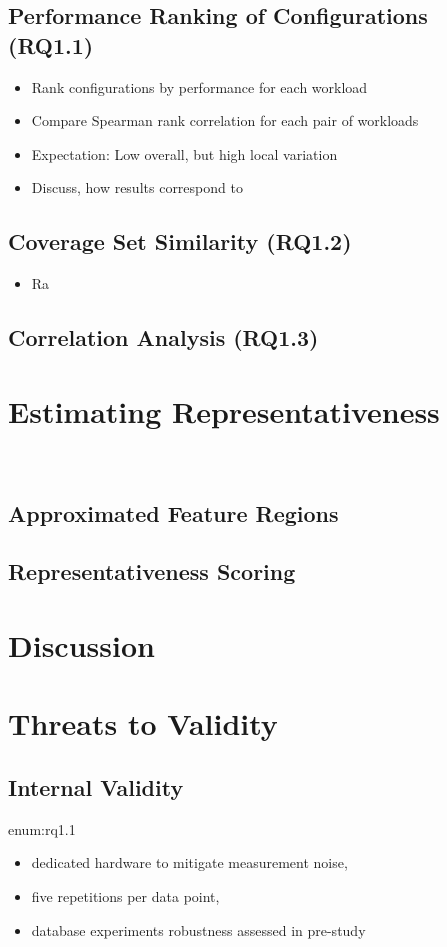 \subsection{Performance Ranking of Configurations (RQ1.1)}
{\color{teal}
\begin{itemize}
	\item Rank configurations by performance for each workload
	\item Compare Spearman rank correlation for each pair of workloads
	\item Expectation: Low overall, but high local variation
	\item Discuss, how results correspond to~\cite{jamishidi_transfer_2017}
\end{itemize}
}
\subsection{Coverage Set Similarity (RQ1.2)}
{\color{teal}
	\begin{itemize}
		\item Ra
	\end{itemize}
}
\subsection{Correlation Analysis (RQ1.3)}

\section{Estimating Representativeness}~\label{sec:metric}

\subsection{Approximated Feature Regions}

\subsection{Representativeness Scoring}

\section{Discussion}

\section{Threats to Validity}
\subsection{Internal Validity}enum:rq1.1
\begin{itemize}
	\item dedicated hardware to mitigate measurement noise, 
	\item five repetitions per data point, 
	\item database experiments robustness assessed in pre-study
\end{itemize}
